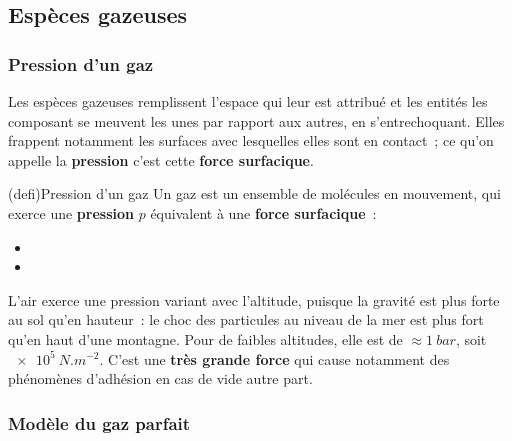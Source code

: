 \documentclass[../../main/main.tex]{subfiles}
\begin{document}
\subsection{Espèces gazeuses}
\subsubsection{Pression d'un gaz}
Les espèces gazeuses remplissent l'espace qui leur est attribué et les entités
les composant se meuvent les unes par rapport aux autres, en s'entrechoquant.
Elles frappent notamment les surfaces avec lesquelles elles sont en contact~;
ce qu'on appelle la \textbf{pression} c'est cette \textbf{force surfacique}.
\smallbreak

\begin{tcb}[label=def:pression, sidebyside,
		sidebyside align=top](defi){Pression d'un gaz}
	Un gaz est un ensemble de molécules en mouvement, qui exerce une
	\textbf{pression} $p$ équivalent à une \textbf{force surfacique}~:
	\csw{
		\[\boxed{p = \frac{F}{S}}\]
	}
	\tcblower
	\begin{itemize}
		\item {}
		\item {}
	\end{itemize}
	\vspace{-15pt}
\end{tcb}

L'air exerce une pression variant avec l'altitude, puisque la gravité
est plus forte au sol qu'en hauteur~: le choc des particules au niveau
de la mer est plus fort qu'en haut d'une montagne.
\smallbreak
Pour de faibles altitudes, elle est de $\approx \SI{1}{bar}$, soit
$\SI{e5}{N.m^{-2}}$. C'est une \textbf{très grande force} qui cause notamment
des phénomènes d'adhésion en cas de vide autre part.

\subsubsection{Modèle du gaz parfait}
\end{document}
